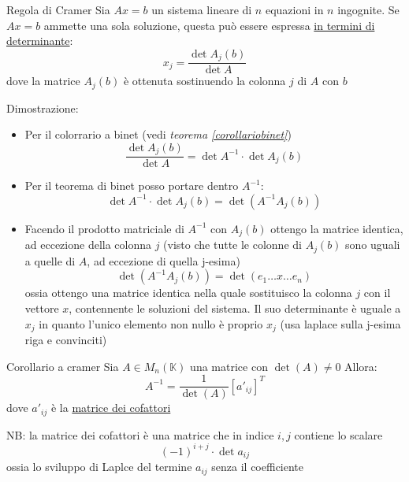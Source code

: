 \begin{teorema}{Regola di Cramer}
	Sia $ Ax = b $ un sistema lineare di $ n $ equazioni in $ n $ ingognite. Se $ Ax = b $ ammette una sola soluzione, questa può essere espressa \underline{in termini di determinante}:
	\[
		x_j = \frac{\det A_j \left( b \right) }{ \det A}
	\]
	dove la matrice $ A_j\left( b \right)  $ è ottenuta sostinuendo la colonna $ j $ di $ A $ con $ b $
\end{teorema}
\label{Cramer}
Dimostrazione:
\begin{itemize}
	\item Per il colorrario a binet (vedi \textit{teorema  \ref{corollariobinet}})
	      \[
		      \frac{ \det A_j \left( b \right) }{ \det A} = \det A^{-1} \cdot \det A_j\left( b \right)
	      \]
	\item Per il teorema di binet posso portare dentro $ A^{-1} $:
	      \[
		      \det A^{-1} \cdot \det A_j\left( b \right) = \det \left( A^{-1}A_j\left( b \right)  \right)
	      \]
	\item Facendo il prodotto matriciale di $ A^{-1} $ con $ A_j \left( b \right)  $ ottengo la matrice identica, ad eccezione della colonna $ j $ (visto che tutte le colonne di $ A_j\left( b \right)  $ sono uguali a quelle di $ A $, ad eccezione di quella j-esima)
	      \[
		      \det \left( A^{-1}A_j\left( b \right)  \right) = \det  \left( e_1\ldots x\ldots e_n \right)
	      \]
	      ossia ottengo una matrice identica nella quale sostituisco la colonna $ j $ con il vettore $ x $, contennente le soluzioni del sistema. Il suo determinante è uguale a $ x_j $ in quanto l'unico elemento non nullo è proprio $ x_j $ (usa laplace sulla j-esima riga e convinciti)

\end{itemize}

\begin{teorema}{Corollario a cramer}
	Sia $ A \in  M_n\left( \mathbb{K} \right)  $ una matrice con $ \det \left( A \right) \neq 0 $ Allora:
	\[
		A^{-1}= \frac{1}{ \det \left( A \right) }\left[ a'_{ij} \right] ^{T}
	\]
	dove $ a'_{ij} $ è la \underline{matrice dei cofattori}
\end{teorema}
NB: la matrice dei cofattori è una matrice che in indice $ i,j $ contiene lo scalare
\[
	\left( -1 \right) ^{i+j} \cdot \det a_{ij}
\]
ossia lo sviluppo di Laplce del termine $ a_{ij} $ senza il coefficiente
